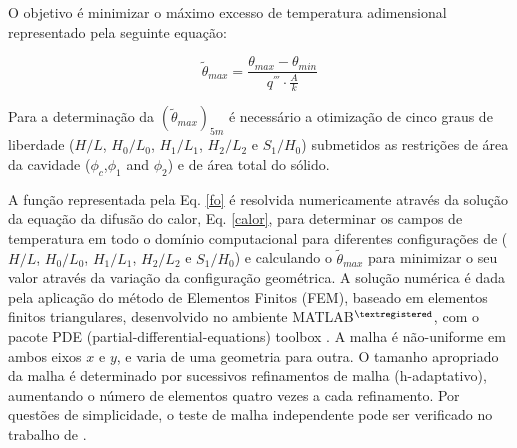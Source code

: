 \documentclass[12pt,A4,A4pt]{article}
\begin{document}
O objetivo é minimizar o máximo excesso de temperatura adimensional representado pela seguinte equação:

\begin{equation}
\tilde{\theta}_{max}=\frac{\theta_{max}-\theta_{min}}{q^{'''}\cdot\frac{A}{k}}\label{fo}
\end{equation}

Para a determinação da $(\tilde{\theta}_{max})_{5m}$ é necessário a otimização de cinco graus de liberdade ($H/L$, $H_{0}/L_{0}$, $H_{1}/L_{1}$, $H_{2}/L_{2}$ e $S_{1}/H_{0}$) submetidos as restrições de área da cavidade ($\phi_{c}$,$\phi_{1}$ and $\phi_{2}$) e de área total do sólido.

A função representada pela Eq. \ref{fo} é resolvida numericamente através da  solução da equação da difusão do calor, Eq. \ref{calor}, para determinar os campos de temperatura em todo o domínio computacional para diferentes configurações de ($H/L$, $H_{0}/L_{0}$, $H_{1}/L_{1}$, $H_{2}/L_{2}$ e $S_{1}/H_{0}$) e calculando o $\tilde{\theta}_{max}$ para minimizar o seu valor através da variação da configuração geométrica. A solução numérica é dada pela aplicação do método de Elementos Finitos (FEM), baseado em elementos finitos triangulares, desenvolvido no ambiente MATLAB$^{\tiny ®}$, com o pacote PDE (partial-differential-equations) toolbox \cite{Reddy1994}. A malha é não-uniforme em ambos eixos $x$ e $y$, e varia de uma geometria para outra. O tamanho apropriado da malha é determinado por sucessivos refinamentos de malha (h-adaptativo), aumentando o número de elementos quatro vezes a cada refinamento. Por questões de simplicidade, o teste de malha independente pode ser verificado no trabalho de .
\end{document}
